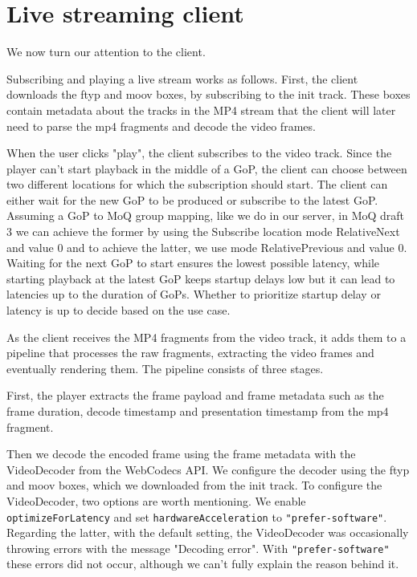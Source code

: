 \section{Live streaming client}\label{section:baseline_client}
We now turn our attention to the client.

Subscribing and playing a live stream works as follows. First, the client downloads the ftyp and moov boxes, by subscribing to the init track. These boxes contain metadata about the tracks in the MP4 stream %
that the client will later need to parse the mp4 fragments and decode the video frames.

When the user clicks "play", the client subscribes to the video track. Since the player can't start playback in the middle of a GoP, the client can choose between two different locations for which the subscription should start. The client can either wait for the new GoP to be produced or subscribe to the latest GoP. Assuming a GoP to MoQ group mapping, like we do in our server, in MoQ draft 3 we can achieve the former by using the Subscribe location mode RelativeNext and value 0 and to achieve the latter, we use mode RelativePrevious and value 0. Waiting for the next GoP to start ensures the lowest possible latency, while starting playback at the latest GoP keeps startup delays low but it can lead to latencies up to the duration of GoPs. %
Whether to prioritize startup delay or latency is up to decide based on the use case.

As the client receives the MP4 fragments from the video track, it adds them to a pipeline that processes the raw fragments, extracting the video frames and eventually rendering them. The pipeline consists of three stages. 

First, the player extracts the frame payload and frame metadata such as the frame duration, decode timestamp and presentation timestamp from the mp4 fragment. 

Then we decode the encoded frame using the frame metadata with the VideoDecoder from the WebCodecs API. We configure the decoder using the ftyp and moov boxes, which we downloaded from the init track.  To configure the VideoDecoder, two options are worth mentioning. We enable \lstinline{optimizeForLatency} %
and set \lstinline{hardwareAcceleration} to \lstinline{"prefer-software"}. Regarding the latter, with the default setting, the VideoDecoder was occasionally throwing errors with the message "Decoding error". With \lstinline{"prefer-software"} these errors did not occur, although we can't fully explain the reason behind it. %

